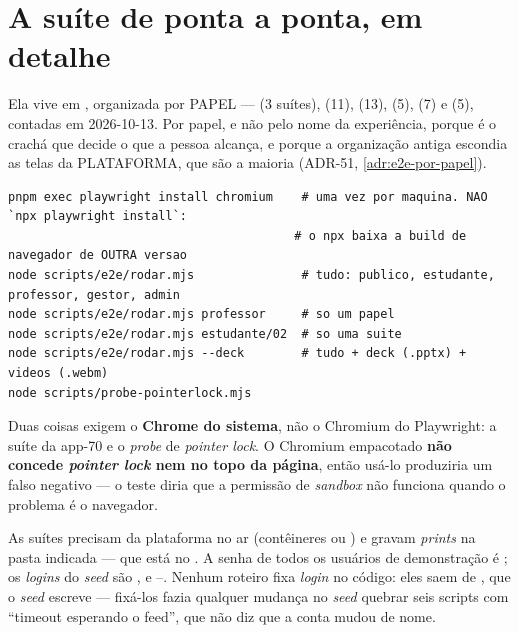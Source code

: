 \section{A suíte de ponta a ponta, em detalhe}

Ela vive em , organizada por PAPEL ---  (3
suítes),  (11),  (13),  (5),
 (7) e  (5), contadas em 2026-10-13. Por papel, e não pelo nome da experiência, porque é o
crachá que decide o que a pessoa alcança, e porque a organização antiga escondia
as telas da PLATAFORMA, que são a maioria (ADR-51,
\autoref{adr:e2e-por-papel}).

\begin{lstlisting}[language=bashunoo, caption={A suíte de ponta a ponta}]
pnpm exec playwright install chromium    # uma vez por maquina. NAO `npx playwright install`:
                                        # o npx baixa a build de navegador de OUTRA versao
node scripts/e2e/rodar.mjs               # tudo: publico, estudante, professor, gestor, admin
node scripts/e2e/rodar.mjs professor     # so um papel
node scripts/e2e/rodar.mjs estudante/02  # so uma suite
node scripts/e2e/rodar.mjs --deck        # tudo + deck (.pptx) + videos (.webm)
node scripts/probe-pointerlock.mjs
\end{lstlisting}

\begin{atencao}
Duas coisas exigem o \textbf{Chrome do sistema}, não o Chromium do
Playwright: a suíte da app-70 e o \emph{probe} de \emph{pointer lock}. O Chromium
empacotado \textbf{não concede \emph{pointer lock} nem no topo da página}, então
usá-lo produziria um falso negativo --- o teste diria que a permissão de
\emph{sandbox} não funciona quando o problema é o navegador.
\end{atencao}

\begin{nota}
As suítes precisam da plataforma no ar (contêineres ou
) e gravam \emph{prints} na pasta indicada --- que está no
. A senha de todos os usuários de demonstração é
; os \emph{logins} do \emph{seed} são ,
 e --. Nenhum roteiro fixa
\emph{login} no código: eles saem de , que o
\emph{seed} escreve --- fixá-los fazia qualquer mudança no \emph{seed} quebrar
seis scripts com \enquote{timeout esperando o feed}, que não diz que a conta
mudou de nome.
\end{nota}

